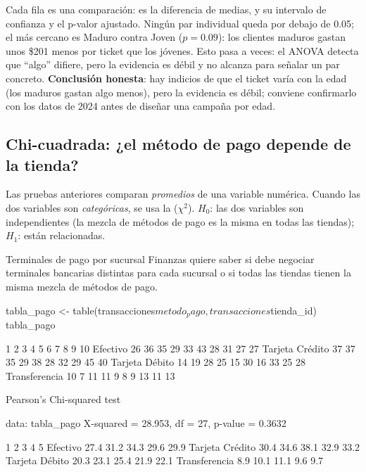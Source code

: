 Cada fila es una comparación:  es la diferencia de medias,
 y  su intervalo de confianza y  el
p-valor ajustado. Ningún par individual queda por debajo de 0.05; el más
cercano es Maduro contra Joven ($p = 0.09$): los clientes maduros gastan unos
\$201 menos por ticket que los jóvenes. Esto pasa a veces: el ANOVA detecta
que ``algo'' difiere, pero la evidencia es débil y no alcanza para señalar
un par concreto. \textbf{Conclusión honesta}: hay indicios de que el ticket
varía con la edad (los maduros gastan algo menos), pero la evidencia es
débil; conviene confirmarlo con los datos de 2024 antes de diseñar una
campaña por edad.

\subsection{Chi-cuadrada: ¿el método de pago depende de la tienda?}

Las pruebas anteriores comparan \emph{promedios} de una variable numérica.
Cuando las dos variables son \emph{categóricas}, se usa la  ($\chi^2$). $H_0$: las dos variables son
independientes (la mezcla de métodos de pago es la misma en todas las
tiendas); $H_1$: están relacionadas.

\begin{ejemplo}{Terminales de pago por sucursal}
Finanzas quiere saber si debe negociar terminales bancarias distintas para
cada sucursal o si todas las tiendas tienen la misma mezcla de métodos de
pago.
\end{ejemplo}

\begin{rcode}
tabla_pago <- table(transacciones$metodo_pago, transacciones$tienda_id)
tabla_pago
\end{rcode}
\begin{rsalida}
                   1  2  3  4  5  6  7  8  9 10
  Efectivo        26 36 35 29 33 43 28 31 27 27
  Tarjeta Crédito 37 37 35 29 38 28 32 29 45 40
  Tarjeta Débito  14 19 28 25 15 30 16 33 25 28
  Transferencia   10  7 11 11  9  8  9 13 11 13
\end{rsalida}

\begin{rsalida}
        Pearson's Chi-squared test

data:  tabla_pago
X-squared = 28.953, df = 27, p-value = 0.3632


                     1    2    3    4    5
  Efectivo        27.4 31.2 34.3 29.6 29.9
  Tarjeta Crédito 30.4 34.6 38.1 32.9 33.2
  Tarjeta Débito  20.3 23.1 25.4 21.9 22.1
  Transferencia    8.9 10.1 11.1  9.6  9.7
\end{rsalida}

